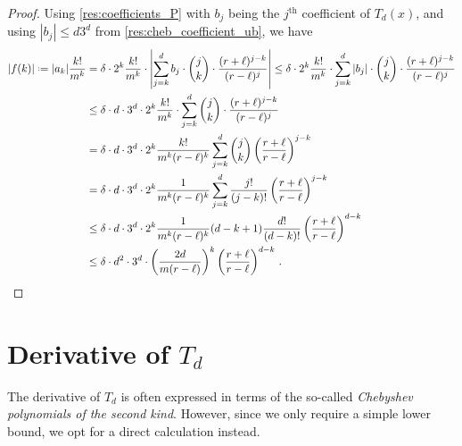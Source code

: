 \documentclass{theoretics}
\newcommand*{\define}{\mathrel{\vcenter{\baselineskip0.5ex \lineskiplimit0pt
                      \hbox{\scriptsize.}\hbox{\scriptsize.}}}%
                      =}
\DeclarePairedDelimiter{\abs}{\lvert}{\rvert}
\begin{document}
\resmaxu*
\begin{proof}
Using \cref{res:coefficients_P} with $b_j$
being the $j^\text{th}$ coefficient of $T_d(x)$, and using $|b_j| \leq d 3^d$ from
\cref{res:cheb_coefficient_ub}, we have 
\begin{align*}
  |f(k)| \define |a_k| \frac{k!}{m^k}
      &= \delta \cdot 2^k \frac{k!}{m^k} \cdot \abs*{ \sum_{j=k}^d b_j \cdot \binom{j}{k}
          \cdot \frac{(r+\ell)^{j-k}}{(r-\ell)^j}} 
      \leq \delta \cdot 2^k \frac{k!}{m^k} \cdot \sum_{j=k}^d |b_j| \cdot \binom{j}{k}
          \cdot \frac{(r+\ell)^{j-k}}{(r-\ell)^j} \\
      &\leq \delta \cdot d \cdot 3^d \cdot 2^k \frac{k!}{m^k}
          \cdot \sum_{j=k}^d  \binom{j}{k} \cdot \frac{(r+\ell)^{j-k}}{(r-\ell)^j} \\
      &=  \delta \cdot d \cdot 3^d \cdot 2^k \frac{k!}{m^k (r-\ell)^k}
         \sum_{j=k}^d \binom{j}{k} \left(\frac{r+\ell}{r-\ell}\right)^{j-k} \\
      &=  \delta \cdot d \cdot 3^d \cdot 2^k \frac{1}{m^k (r-\ell)^k}
         \sum_{j=k}^d \frac{j!}{(j-k)!} \left(\frac{r+\ell}{r-\ell}\right)^{j-k} \\
      &\leq  \delta \cdot d \cdot 3^d \cdot 2^k \frac{1}{m^k (r-\ell)^k} (d-k+1) \frac{d!}{(d-k)!}
         \left(\frac{r+\ell}{r-\ell}\right)^{d-k} \\
      &\leq  \delta \cdot d^2 \cdot 3^d \cdot \left( \frac{2d}{m (r-\ell)} \right)^k
         \left(\frac{r+\ell}{r-\ell}\right)^{d-k} \,. \qedhere
\end{align*}
\end{proof}

\section{Derivative of \texorpdfstring{$T_d$}{Td}}
\label{section:td-prime}

The derivative of $T_d$ is often expressed in terms of the so-called \emph{Chebyshev polynomials of
the second kind}. However, since we only require a simple lower bound, we opt for a direct
calculation instead.
\end{document}

